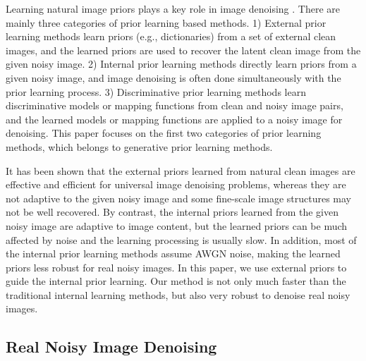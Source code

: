 Learning natural image priors plays a key role in image denoising
\cite{blsgsm,
zhou2012nonparametric,ksvd,lssc,ncsr,foe,epll,pgpd,mlp,xie2012image,dncnn,
barbu2009training,csf,chen2015learning}. There are mainly three categories of prior learning based methods. 1) External prior learning methods \cite{foe,epll,pgpd} learn priors (e.g., dictionaries) from a set of external clean images, and the learned priors are used to recover the latent clean image from the given noisy image. 2) Internal prior learning methods \cite{blsgsm,zhou2012nonparametric,ksvd,lssc,ncsr} directly learn priors from a given noisy image, and image denoising is often done simultaneously with the prior learning process. 3) Discriminative prior learning methods \cite{mlp,xie2012image,dncnn,barbu2009training,
csf,chen2015learning} learn discriminative models or mapping functions from clean and noisy image pairs, and the learned models or mapping functions are applied to a noisy image for denoising. This paper focuses on the first two categories of prior learning methods, which belongs to generative prior learning methods. 

It has been shown \cite{foe,epll,pgpd} that the external priors learned from natural clean images are effective and efficient for universal image denoising problems, whereas they are not adaptive to the given noisy image and some fine-scale image structures may not be well recovered. By contrast, the internal priors learned from the given noisy image are adaptive to image content, but the learned priors can be much affected by noise and the learning processing is usually slow. In addition, most of the internal prior learning methods \cite{blsgsm,zhou2012nonparametric,ksvd,lssc,ncsr} assume AWGN noise, making the learned priors less robust for real noisy images. In this paper, we use external priors to guide the internal prior learning. Our method is not only much faster than the traditional internal learning methods, but also very robust to denoise real noisy images.


\subsection{Real Noisy Image Denoising}

